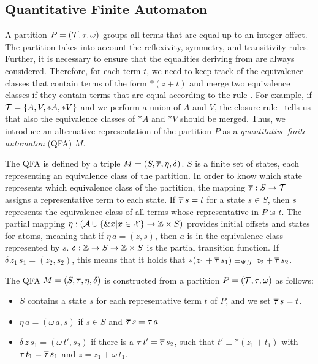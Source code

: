 \subsection{Quantitative Finite Automaton}\label{subsection:qfa}

A partition $P = (\mathcal{T}, \tau, \omega)$ groups all terms that are equal up to an integer offset.
The partition takes into account the reflexivity, symmetry, and transitivity rules.
Further, it is necessary to ensure that the equalities deriving from  are always considered.
Therefore, for each term $t$, we need to keep track of the equivalence classes that contain terms of the form $*(z+t)$ and merge two equivalence classes if they contain terms that are equal according to the rule .
For example, if $\mathcal{T} = \{A, V, *A, *V\}$ and we perform a union of $A$ and $V$, the closure rule~ tells us that also the equivalence classes of $*A$ and $*V$ should be merged.
Thus, we introduce an alternative representation of the partition $P$ as a \emph{quantitative finite automaton} (QFA) $M$.

The QFA is defined by a triple $M = (S, \overline{\tau}, \eta, \delta)$. $S$ is a finite set of states, each representing an equivalence class of the partition.
In order to know which state represents which equivalence class of the partition, the mapping $\overline{\tau} : S \rightarrow \mathcal{T}$ assigns a representative term to each state.
If $\overline{\tau}\,s = t$ for a state $s \in S$, then $s$ represents the equivalence class of all terms whose representative in $P$ is $t$.
The partial mapping $\eta : (\mathcal{A} \cup \{\&x | x \in \mathcal{X}\} \rightarrow \mathbb{Z} \times S)$ provides initial offsets and states for atoms, meaning that if $\eta\,a = (z,s)$, then $a$ is in the equivalence class represented by $s$.
$\delta : \mathbb{Z} \rightarrow S \rightarrow \mathbb{Z} \times S$ is the partial transition function.
If $\delta\,z_1\,s_1 = (z_2, s_2)$, this means that it holds that $*(z_1 + \overline{\tau}\,s_1) \equiv_{\Psi,\mathcal{T}} z_2 + \overline{\tau}\,s_2$.

The QFA $M = (S, \overline{\tau}, \eta, \delta)$ is constructed from a partition $P = (\mathcal{T}, \tau, \omega)$ as follows:
\begin{itemize}
  \item $S$ contains a state $s$ for each representative term $t$ of $P$, and we set $\overline{\tau}\,s = t$.
  \item $\eta\,a = (\omega\,a, s)$ if $s \in S$ and $\overline{\tau}\,s = \tau\,a$
  \item $\delta\,z\,s_1 = (\omega\,t', s_2)$ if there is a $\tau\,t'=\overline{\tau}\,s_2$, such that $t' \equiv *(z_1 + t_1)$ with $\tau \,t_1= \overline{\tau}\,s_1$ and $z = z_1 + \omega\,t_1$.
\end{itemize}

